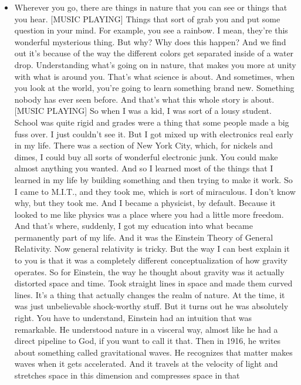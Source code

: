\begin{itemize}
\tightlist
\item
  Wherever you go, there are things in nature that you can see or things
  that you hear. {[}MUSIC PLAYING{]} Things that sort of grab you and
  put some question in your mind. For example, you see a rainbow. I
  mean, they're this wonderful mysterious thing. But why? Why does this
  happen? And we find out it's because of the way the different colors
  get separated inside of a water drop. Understanding what's going on in
  nature, that makes you more at unity with what is around you. That's
  what science is about. And sometimes, when you look at the world,
  you're going to learn something brand new. Something nobody has ever
  seen before. And that's what this whole story is about. {[}MUSIC
  PLAYING{]} So when I was a kid, I was sort of a lousy student. School
  was quite rigid and grades were a thing that some people made a big
  fuss over. I just couldn't see it. But I got mixed up with electronics
  real early in my life. There was a section of New York City, which,
  for nickels and dimes, I could buy all sorts of wonderful electronic
  junk. You could make almost anything you wanted. And so I learned most
  of the things that I learned in my life by building something and then
  trying to make it work. So I came to M.I.T., and they took me, which
  is sort of miraculous. I don't know why, but they took me. And I
  became a physicist, by default. Because it looked to me like physics
  was a place where you had a little more freedom. And that's where,
  suddenly, I got my education into what became permanently part of my
  life. And it was the Einstein Theory of General Relativity. Now
  general relativity is tricky. But the way I can best explain it to you
  is that it was a completely different conceptualization of how gravity
  operates. So for Einstein, the way he thought about gravity was it
  actually distorted space and time. Took straight lines in space and
  made them curved lines. It's a thing that actually changes the realm
  of nature. At the time, it was just unbelievable shock-worthy stuff.
  But it turns out he was absolutely right. You have to understand,
  Einstein had an intuition that was remarkable. He understood nature in
  a visceral way, almost like he had a direct pipeline to God, if you
  want to call it that. Then in 1916, he writes about something called
  gravitational waves. He recognizes that matter makes waves when it
  gets accelerated. And it travels at the velocity of light and
  stretches space in this dimension and compresses space in that

\end{itemize}
